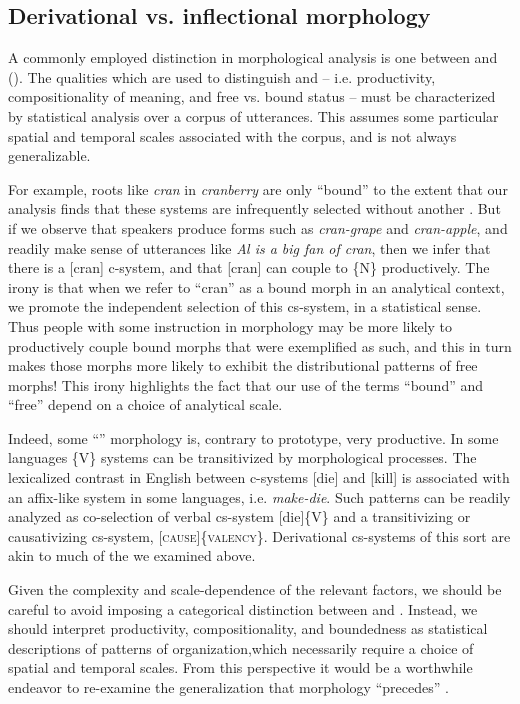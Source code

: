 \subsection{Derivational vs. inflectional morphology}

A commonly employed distinction in morphological analysis is one between  and  (\citealt{BickelNichols2007,Booij1996,Dressler1989,HaspelmathSims2013}). The qualities which are used to distinguish  and  -- i.e. productivity, compositionality of meaning, and free vs. bound status -- must be characterized by statistical analysis over a corpus of utterances. This assumes some particular spatial and temporal scales associated with the corpus, and is not always generalizable. 

  For example, roots like \textit{cran} in \textit{cranberry} are only “bound” to the extent that our analysis finds that these systems are infrequently selected without another . But if we observe that speakers produce forms such as \textit{cran-grape} and \textit{cran-apple}, and readily make sense of utterances like \textit{Al is a big fan of cran}, then we infer that there is a [cran] c-system, and that [cran] can couple to \{N\} productively. The irony is that when we refer to “cran” as a bound morph in an analytical context, we promote the independent selection of this cs-system, in a statistical sense. Thus people with some instruction in morphology may be more likely to productively couple bound morphs that were exemplified as such, and this in turn makes those morphs more likely to exhibit the distributional patterns of free morphs! This irony highlights the fact that our use of the terms “bound” and “free” depend on a choice of analytical scale.

  Indeed, some “” morphology is, contrary to prototype, very productive. In some languages  \{V\} systems can be transitivized by morphological processes. The lexicalized  contrast in English between c-systems [die] and [kill] is associated with an affix-like system in some languages, i.e. \textit{make-die}. Such patterns can be readily analyzed as co-selection of verbal cs-system [die]\{V\} and a transitivizing or causativizing cs-system, [\textsc{cause}]\{\textsc{va\-len\-cy}\}. Derivational cs-systems of this sort are akin to much of the  we examined above. 

  Given the complexity and scale-dependence of the relevant factors, we should be careful to avoid imposing a categorical distinction between  and . Instead, we should interpret productivity, compositionality, and boundedness as statistical descriptions of patterns of organization,\linebreak which necessarily require a choice of spatial and temporal scales. From this perspective it would be a worthwhile endeavor to re-examine the generalization that  morphology “precedes”  \citep{Booij1996}.

